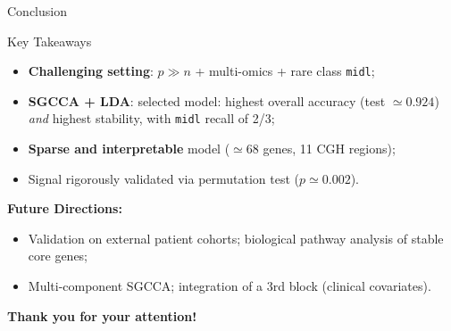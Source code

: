 \documentclass[aspectratio=169, 10pt]{beamer}
\begin{document}
\begin{frame}{Conclusion}
  \begin{block}{Key Takeaways}
    \begin{itemize}
      \item \textbf{Challenging setting}: $p \gg n$ + multi-omics + rare class \texttt{midl};
      \item \textbf{SGCCA + LDA}: selected model: highest overall accuracy (test $\simeq 0.924$) \textit{and} highest stability, with \texttt{midl} recall of 2/3;
      \item \textbf{Sparse and interpretable} model ($\simeq 68$ genes, 11 CGH regions);
      \item Signal rigorously validated via permutation test ($p \simeq 0.002$).
    \end{itemize}
  \end{block}

  \medskip
  \textbf{Future Directions:}
  \begin{itemize}
    \item Validation on external patient cohorts; biological pathway analysis of stable core genes;
    \item Multi-component SGCCA; integration of a 3rd block (clinical covariates).
  \end{itemize}

  \vfill
  \begin{center}
    {\large \textbf{Thank you for your attention!}}
  \end{center}
\end{frame}
\end{document}
